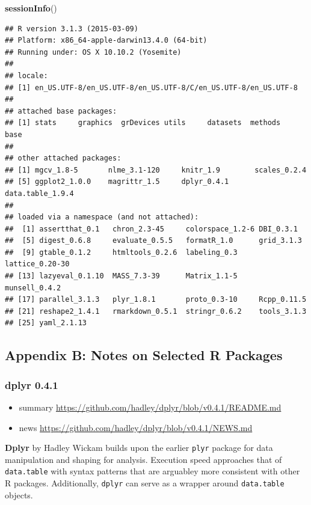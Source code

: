 \documentclass[]{article}
\newenvironment{Shaded}{\begin{snugshade}}{\end{snugshade}}
\newcommand{\KeywordTok}[1]{\textcolor[rgb]{0.13,0.29,0.53}{\textbf{{#1}}}}
\newcommand{\NormalTok}[1]{{#1}}
\begin{document}
\begin{Shaded}
\begin{Highlighting}[]
\KeywordTok{sessionInfo}\NormalTok{()}
\end{Highlighting}
\end{Shaded}

\begin{verbatim}
## R version 3.1.3 (2015-03-09)
## Platform: x86_64-apple-darwin13.4.0 (64-bit)
## Running under: OS X 10.10.2 (Yosemite)
## 
## locale:
## [1] en_US.UTF-8/en_US.UTF-8/en_US.UTF-8/C/en_US.UTF-8/en_US.UTF-8
## 
## attached base packages:
## [1] stats     graphics  grDevices utils     datasets  methods   base     
## 
## other attached packages:
## [1] mgcv_1.8-5       nlme_3.1-120     knitr_1.9        scales_0.2.4    
## [5] ggplot2_1.0.0    magrittr_1.5     dplyr_0.4.1      data.table_1.9.4
## 
## loaded via a namespace (and not attached):
##  [1] assertthat_0.1   chron_2.3-45     colorspace_1.2-6 DBI_0.3.1       
##  [5] digest_0.6.8     evaluate_0.5.5   formatR_1.0      grid_3.1.3      
##  [9] gtable_0.1.2     htmltools_0.2.6  labeling_0.3     lattice_0.20-30 
## [13] lazyeval_0.1.10  MASS_7.3-39      Matrix_1.1-5     munsell_0.4.2   
## [17] parallel_3.1.3   plyr_1.8.1       proto_0.3-10     Rcpp_0.11.5     
## [21] reshape2_1.4.1   rmarkdown_0.5.1  stringr_0.6.2    tools_3.1.3     
## [25] yaml_2.1.13
\end{verbatim}

\subsection{Appendix B: Notes on Selected R
Packages}\label{appendix-b-notes-on-selected-r-packages}

\subsubsection{dplyr 0.4.1}\label{dplyr-0.4.1}

\begin{itemize}
\itemsep1pt\parskip0pt
\item
  summary \url{https://github.com/hadley/dplyr/blob/v0.4.1/README.md}
\item
  news \url{https://github.com/hadley/dplyr/blob/v0.4.1/NEWS.md}
\end{itemize}

\textbf{Dplyr} by Hadley Wickam builds upon the earlier \texttt{plyr}
package for data manipulation and shaping for analysis. Execution speed
approaches that of \texttt{data.table} with syntax patterns that are
arguabley more consistent with other R packages. Additionally,
\texttt{dplyr} can serve as a wrapper around \texttt{data.table}
objects.
\end{document}
